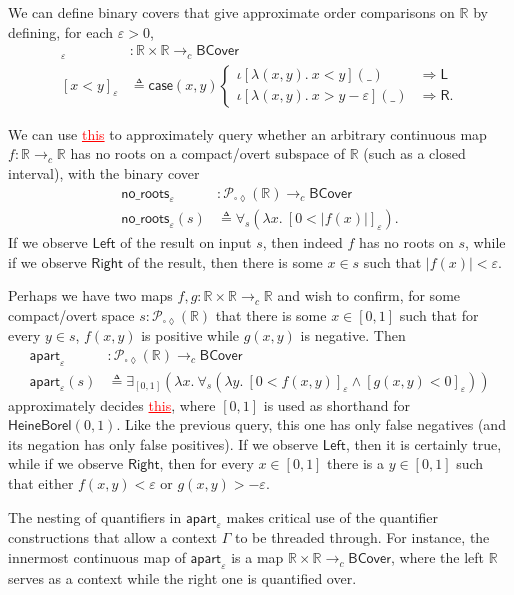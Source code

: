 \documentclass[conference]{IEEEtran}
\newcommand{\Viet}{\mathcal{P}_{\square\lozenge}}
\newcommand{\cto}{\to_c}
\newcommand{\R}{\mathbb{R}}
\newcommand{\fun}[2]{\lambda {#1}.\  {#2}}
\newcommand{\wildcard}{\_}
\newcommand{\oinclf}[1]{\iota[{#1}]}
\newcommand{\oincl}[2]{\oinclf{#1} \left({#2}\right)}
\newcommand{\Branch}{\Rightarrow}
\newcommand{\BCover}{\mathsf{BCover}}
\newcommand{\grammar}[1]{\textcolor{red}{\underline{#1}}}
\begin{document}
We can define binary covers that give approximate order comparisons on $\R$ by defining, for each $\varepsilon > 0$,
\begin{align*}
[ \cdot < \cdot ]_\varepsilon &: \R \times \R \cto \BCover
\\ [x < y]_\varepsilon &\triangleq \mathsf{case}(x, y)
\begin{cases}
\oincl{\fun{(x, y)}{x < y}}{\wildcard} &\Branch \mathsf{L}
\\ \oincl{\fun{(x, y)}{x > y - \varepsilon}}{\wildcard} &\Branch \mathsf{R}.
\end{cases}
\end{align*}

We can use \grammar{this} to approximately query whether an arbitrary continuous map $f : \R \cto \R$ has no roots on a compact/overt subspace of $\R$ (such as a closed interval), with the binary cover
\begin{align*}
\mathsf{no\_roots}_{\varepsilon} &: \Viet(\R) \cto \BCover
\\ \mathsf{no\_roots}_\varepsilon(s) &\triangleq
  \forall_{s}(\fun{x}{[ 0 < |f(x)| ]_\varepsilon}).
\end{align*}
If we observe $\mathsf{Left}$ of the result on input $s$, then indeed $f$ has no roots on $s$, while if we observe $\mathsf{Right}$ of the result, then there is some $x \in s$ such that $|f(x)| < \varepsilon$.

Perhaps we have two maps $f, g : \R \times \R \cto \R$ and wish to confirm, for some compact/overt space $s : \Viet(\R)$ that there is some $x \in [0,1]$ such that for every $y \in s$, $f(x, y)$ is positive while $g(x,y)$ is negative. Then
\begin{align*}
\mathsf{apart}_{\varepsilon} &: \Viet(\R) \cto \BCover
\\ \mathsf{apart}_\varepsilon(s) &\triangleq
  \exists_{[0,1]}(\fun{x}{\forall_{s}(\fun{y}{[ 0 < f(x, y) ]_\varepsilon \wedge [g(x, y) < 0]_\varepsilon})})
\end{align*}
approximately decides \grammar{this}, where $[0,1]$ is used as shorthand for $\mathsf{HeineBorel}(0,1)$.
Like the previous query, this one has only false negatives (and its negation has only false positives). If we observe $\mathsf{Left}$, then it is certainly true, while if we observe $\mathsf{Right}$, then for every $x \in [0,1]$ there is a $y \in [0,1]$ such that either $f(x, y) < \varepsilon$ or $g(x, y) > -\varepsilon$.

The nesting of quantifiers in $\mathsf{apart}_\varepsilon$ makes critical use of the quantifier constructions that allow a context $\Gamma$ to be threaded through. For instance, the innermost continuous map of $\mathsf{apart}_\varepsilon$ is a map $\R \times \R \cto \BCover$, where the left $\R$ serves as a context while the right one is quantified over.
\end{document}
